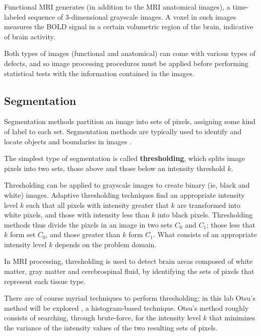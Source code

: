 Functional MRI generates (in addition to the MRI anatomical images), a time-labeled sequence of 3-dimensional grayscale images. A voxel in such images measures the BOLD signal in a certain volumetric region of the brain, indicative of brain activity.

Both types of images (functional and anatomical) can come with various types of defects, and so image processing procedures must be applied before performing statistical tests with the information contained in the images.

\subsection*{Segmentation}
Segmentation methods partition an image into sets of pixels, assigning some kind of label to each set. Segmentation methods are typically used to identify and locate objects and boundaries in images .

The simplest type of segmentation is called \textbf{thresholding}, which splits image pixels into two sets, those above and those below an intensity threshold $k$. 


Thresholding can be applied to grayscale images to create binary (ie, black and white) images. Adaptive thresholding techniques find an appropriate intensity  level $k$ such that all pixels with intensity greater that $k$ are transformed into white pixels, and those with intensity less than $k$ into black pixels. Thresholding methods thus divide the pixels in an image in two sets $C_0$ and $C_1$; those less that $k$ form set $C_0$, and those greater than $k$ form $C_1$. What consists of an appropriate intensity level $k$ depends on the problem domain.

In MRI processing, thresholding is used to detect brain areas composed of white matter, gray matter and cerebrospinal fluid, by identifying the sets of pixels that represent each tissue type.

There are of course myriad techniques to perform thresholding; in this lab Otsu's method will be explored
\cite{otsu1975threshold}, a histogram-based technique. Otsu's method roughly consists of searching, through brute-force, for the intensity level $k$ that minimizes the variance of the intensity values of the two resulting sets of pixels.

